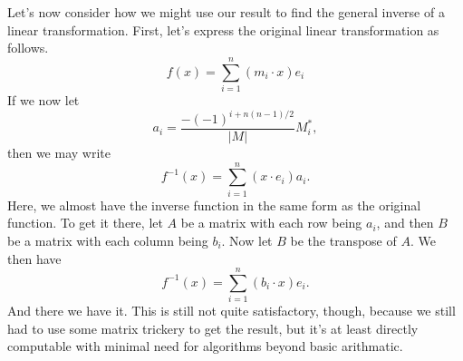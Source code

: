 \documentclass[12pt]{article}
\begin{document}
Let's now consider how we might use our result to find the general inverse of a linear transformation.
First, let's express the original linear transformation as follows.
\begin{equation}
f(x) = \sum_{i=1}^n (m_i\cdot x)e_i
\end{equation}
If we now let
\begin{equation}
a_i = \frac{-(-1)^{i+n(n-1)/2}}{|M|}M_i^{*},
\end{equation}
then we may write
\begin{equation}
f^{-1}(x)=\sum_{i=1}^n (x\cdot e_i)a_i.
\end{equation}
Here, we almost have the inverse function in the same form as the original function.
To get it there, let $A$ be a matrix with each row being $a_i$, and then $B$ be a
matrix with each column being $b_i$.  Now let $B$ be the transpose of $A$.
We then have
\begin{equation}
f^{-1}(x)=\sum_{i=1}^n (b_i\cdot x)e_i.
\end{equation}
And there we have it.  This is still not quite satisfactory, though, because we still had to use some
matrix trickery to get the result, but it's at least directly computable with minimal need for algorithms
beyond basic arithmatic.
\end{document}
